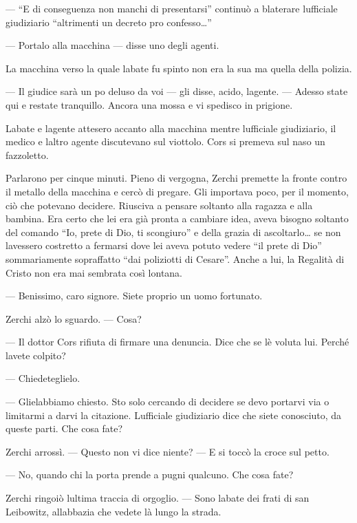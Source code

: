 --- ``E di conseguenza non manchi di presentarsi'' continuò a blaterare
l\textquotesingle ufficiale giudiziario ``altrimenti un decreto pro
confesso\ldots''

--- Portalo alla macchina --- disse uno degli agenti.

La macchina verso la quale l\textquotesingle abate fu spinto non era la
sua ma quella della polizia.

--- Il giudice sarà un po\textquotesingle{} deluso da voi --- gli disse,
acido, l\textquotesingle agente. --- Adesso state qui e restate
tranquillo. Ancora una mossa e vi spedisco in prigione.

L\textquotesingle abate e l\textquotesingle agente attesero accanto alla
macchina mentre l\textquotesingle ufficiale giudiziario, il medico e
l\textquotesingle altro agente discutevano sul viottolo. Cors si premeva
sul naso un fazzoletto.

Parlarono per cinque minuti. Pieno di vergogna, Zerchi premette la
fronte contro il metallo della macchina e cercò di pregare. Gli
importava poco, per il momento, ciò che potevano decidere. Riusciva a
pensare soltanto alla ragazza e alla bambina. Era certo che lei era già
pronta a cambiare idea, aveva bisogno soltanto del comando ``Io, prete
di Dio, ti scongiuro'' e della grazia di ascoltarlo\ldots{} se non
l\textquotesingle avessero costretto a fermarsi dove lei aveva potuto
vedere ``il prete di Dio'' sommariamente sopraffatto ``dai poliziotti di
Cesare''. Anche a lui, la Regalità di Cristo non era mai sembrata così
lontana.

--- Benissimo, caro signore. Siete proprio un uomo fortunato.

Zerchi alzò lo sguardo. --- Cosa?

--- Il dottor Cors rifiuta di firmare una denuncia. Dice che se
l\textquotesingle è voluta lui. Perché l\textquotesingle avete colpito?

--- Chiedeteglielo.

--- Gliel\textquotesingle abbiamo chiesto. Sto solo cercando di decidere
se devo portarvi via o limitarmi a darvi la citazione.
L\textquotesingle ufficiale giudiziario dice che siete conosciuto, da
queste parti. Che cosa fate?

Zerchi arrossì. --- Questo non vi dice niente? --- E si toccò la croce
sul petto.

--- No, quando chi la porta prende a pugni qualcuno. Che cosa fate?

Zerchi ringoiò l\textquotesingle ultima traccia di orgoglio. --- Sono
l\textquotesingle abate dei frati di san Leibowitz,
all\textquotesingle abbazia che vedete là lungo la strada.

